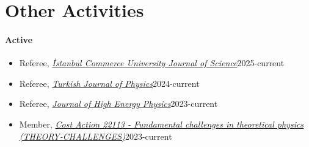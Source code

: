\documentclass[a4paper,11pt]{article}
\begin{document}
\section{\textcolor{burntorange}{Other Activities}}
\paragraph{Active}
\begin{itemize}
    \item[] Referee, \emph{\hyperref{https://dergipark.org.tr/en/pub/ticaretfbd}{}{}{İstanbul Commerce University Journal of Science}}\hfill 2025-current
    \item[] Referee, \emph{\hyperref{https://journals.tubitak.gov.tr/physics/}{}{}{Turkish Journal of Physics}}\hfill 2024-current\hspace*{2.2em}
	\item[] Referee, \emph{\hyperref{https://jhep.sissa.it/}{}{}{Journal of High Energy Physics}}\hfill 2023-current
	\item[] Member, \emph{\hyperref{https://www.cost.eu/actions/CA22113}{}{}{Cost Action 22113 - Fundamental challenges in theoretical physics (THEORY-CHALLENGES)}}\hfill 2023-current
\end{itemize}
\end{document}
